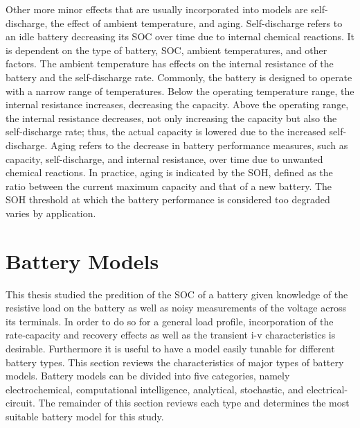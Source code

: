 \documentclass[../zhang_thesis.tex]{subfiles}
\begin{document}
Other more minor effects that are usually incorporated into models are self-discharge, the effect of ambient temperature, and aging. Self-discharge refers to an idle battery decreasing its SOC over time due to internal chemical reactions. It is dependent on the type of battery, SOC, ambient temperatures, and other factors. The ambient temperature has effects on the internal resistance of the battery and the self-discharge rate. Commonly, the battery is designed to operate with a narrow range of temperatures. Below the operating temperature range, the internal resistance increases, decreasing the capacity. Above the operating range, the internal resistance decreases, not only increasing the capacity but also the self-discharge rate; thus, the actual capacity is lowered due to the increased self-discharge. Aging refers to the decrease in battery performance measures, such as capacity, self-discharge, and internal resistance, over time due to unwanted chemical reactions. In practice, aging is indicated by the SOH, defined as the ratio between the current maximum capacity and that of a new battery. The SOH threshold at which the battery performance is considered too degraded varies by application.



\section{Battery Models}

This thesis studied the predition of the SOC of a battery given knowledge of the resistive load on the battery as well as noisy measurements of the voltage across its terminals. In order to do so for a general load profile, incorporation of the rate-capacity and recovery effects as well as the transient i-v characteristics is desirable. Furthermore it is useful to have a model easily tunable for different battery types. This section reviews the characteristics of major types of
battery models. Battery models can be divided into five categories, namely electrochemical, computational intelligence, analytical, stochastic, and electrical-circuit. The remainder of this section reviews each type and determines the most suitable battery model for this study.
\end{document}
